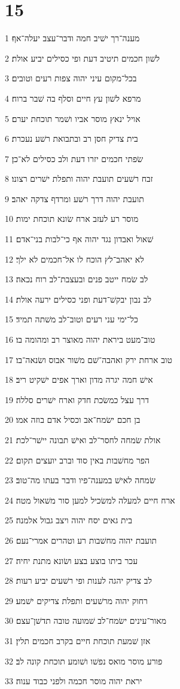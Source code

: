 \chapter{15}

\par 1 מענה־רך ישׁיב חמה ודבר־עצב יעלה־אף׃
\par 2 לשׁון חכמים תיטיב דעת ופי כסילים יביע אולת׃
\par 3 בכל־מקום עיני יהוה צפות רעים וטובים׃
\par 4 מרפא לשׁון עץ חיים וסלף בה שׁבר ברוח׃
\par 5 אויל ינאץ מוסר אביו ושׁמר תוכחת יערם׃
\par 6 בית צדיק חסן רב ובתבואת רשׁע נעכרת׃
\par 7 שׂפתי חכמים יזרו דעת ולב כסילים לא־כן׃
\par 8 זבח רשׁעים תועבת יהוה ותפלת ישׁרים רצונו׃
\par 9 תועבת יהוה דרך רשׁע ומרדף צדקה יאהב׃
\par 10 מוסר רע לעזב ארח שׂונא תוכחת ימות׃
\par 11 שׁאול ואבדון נגד יהוה אף כי־לבות בני־אדם׃
\par 12 לא יאהב־לץ הוכח לו אל־חכמים לא ילך׃
\par 13 לב שׂמח ייטב פנים ובעצבת־לב רוח נכאה׃
\par 14 לב נבון יבקשׁ־דעת ופני כסילים ירעה אולת׃
\par 15 כל־ימי עני רעים וטוב־לב משׁתה תמיד׃
\par 16 טוב־מעט ביראת יהוה מאוצר רב ומהומה בו׃
\par 17 טוב ארחת ירק ואהבה־שׁם משׁור אבוס ושׂנאה־בו׃
\par 18 אישׁ חמה יגרה מדון וארך אפים ישׁקיט ריב׃
\par 19 דרך עצל כמשׂכת חדק וארח ישׁרים סללה׃
\par 20 בן חכם ישׂמח־אב וכסיל אדם בוזה אמו׃
\par 21 אולת שׂמחה לחסר־לב ואישׁ תבונה יישׁר־לכת׃
\par 22 הפר מחשׁבות באין סוד וברב יועצים תקום׃
\par 23 שׂמחה לאישׁ במענה־פיו ודבר בעתו מה־טוב׃
\par 24 ארח חיים למעלה למשׂכיל למען סור משׁאול מטה׃
\par 25 בית גאים יסח יהוה ויצב גבול אלמנה׃
\par 26 תועבת יהוה מחשׁבות רע וטהרים אמרי־נעם׃
\par 27 עכר ביתו בוצע בצע ושׂונא מתנת יחיה׃
\par 28 לב צדיק יהגה לענות ופי רשׁעים יביע רעות׃
\par 29 רחוק יהוה מרשׁעים ותפלת צדיקים ישׁמע׃
\par 30 מאור־עינים ישׂמח־לב שׁמועה טובה תדשׁן־עצם׃
\par 31 אזן שׁמעת תוכחת חיים בקרב חכמים תלין׃
\par 32 פורע מוסר מואס נפשׁו ושׁומע תוכחת קונה לב׃
\par 33 יראת יהוה מוסר חכמה ולפני כבוד ענוה׃

